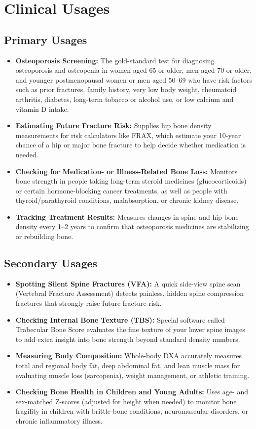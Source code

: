 \section{Clinical Usages}

\subsection{Primary Usages}
\begin{itemize}
\item \textbf{Osteoporosis Screening:} The gold-standard test for diagnosing osteoporosis and osteopenia in women aged 65 or older, men aged 70 or older, and younger postmenopausal women or men aged 50--69 who have risk factors such as prior fractures, family history, very low body weight, rheumatoid arthritis, diabetes, long-term tobacco or alcohol use, or low calcium and vitamin D intake.
\item \textbf{Estimating Future Fracture Risk:} Supplies hip bone density measurements for risk calculators like FRAX, which estimate your 10-year chance of a hip or major bone fracture to help decide whether medication is needed.
\item \textbf{Checking for Medication- or Illness-Related Bone Loss:} Monitors bone strength in people taking long-term steroid medicines (glucocorticoids) or certain hormone-blocking cancer treatments, as well as people with thyroid/parathyroid conditions, malabsorption, or chronic kidney disease.
\item \textbf{Tracking Treatment Results:} Measures changes in spine and hip bone density every 1--2 years to confirm that osteoporosis medicines are stabilizing or rebuilding bone.
\end{itemize}

\subsection{Secondary Usages}
\begin{itemize}
\item \textbf{Spotting Silent Spine Fractures (VFA):} A quick side-view spine scan (Vertebral Fracture Assessment) detects painless, hidden spine compression fractures that strongly raise future fracture risk.
\item \textbf{Checking Internal Bone Texture (TBS):} Special software called Trabecular Bone Score evaluates the fine texture of your lower spine images to add extra insight into bone strength beyond standard density numbers.
\item \textbf{Measuring Body Composition:} Whole-body DXA accurately measures total and regional body fat, deep abdominal fat, and lean muscle mass for evaluating muscle loss (sarcopenia), weight management, or athletic training.
\item \textbf{Checking Bone Health in Children and Young Adults:} Uses age- and sex-matched Z-scores (adjusted for height when needed) to monitor bone fragility in children with brittle-bone conditions, neuromuscular disorders, or chronic inflammatory illness.
\end{itemize}


